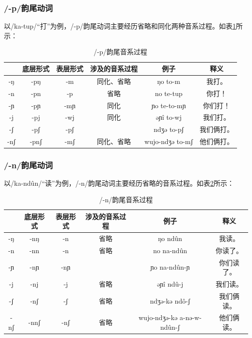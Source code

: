 \subsubsection{/-p/韵尾动词}

以/ka-tup/“打”为例，/-p/韵尾动词主要经历省略和同化两种音系过程。如表\ref{pcodapro}所示：

\begin{table}[H]
\vspace{5pt}
    \centering
    \caption{/-p/韵尾音系过程}
    \label{pcodapro}
\begin{tabular}{c|ccccc}
\toprule
    & 底层形式 & 表层形式 & 涉及的音系过程 & 例子                      & 释义     \\
\midrule
-ŋ  & -pŋ  & -m   & 同化、省略   & ŋo to-m         & 我打。   \\
-n  & -pn  & -p   & 省略      & no te-tup       & 你打！   \\
-ɲ  & -pɲ  & -mɲ  & 同化      & ɲo te-to-mɲ     & 你们打！  \\
-j  & -pj  & -wj  & 同化      & əɲî to-wj      & 我们打。  \\
-ʃ  & -pʃ  & -pʃ  &         & ndʒə to-pʃ      & 我们俩打。 \\
-nʃ & -pnʃ & -mʃ  & 同化、省略   & wujo-ndʒə to-mʃ & 他们俩打。\\
\bottomrule
\end{tabular}
\end{table}

\subsubsection{/-n/韵尾动词}

以/ka-ndûn/“读”为例，/-n/韵尾动词主要经历省略的音系过程。如表\ref{ncodapro}所示：

\begin{table}[H]
\vspace{5pt}
    \centering
    \caption{/-n/韵尾音系过程}
    \label{ncodapro}
\begin{tabular}{c|ccccc}
\toprule
    & 底层形式 & 表层形式 & 涉及的音系过程 & 例子                      & 释义     \\
\midrule
-ŋ  & -nŋ  & -n   & 省略      & ŋo ndûn                   & 我读。   \\
-n  & -nn  & -n   & 省略      & no na-ndûn                & 你读了。  \\
-ɲ  & -nɲ  & -nɲ  &         & ɲo na-ndûn-ɲ               & 你们读了。 \\
-j  & -nj  & -j   & 省略      & əɲî ndû-j                 & 我们读。  \\
-ʃ  & -nʃ  & -ʃ   & 省略      & ndʒə-kə ndô-ʃ              & 我们俩读。 \\
-nʃ & -nnʃ & -nʃ  & 省略      & wujo-ndʒə-kə a-nə-w-ndûn-ʃ & 他们俩读。\\
\bottomrule
\end{tabular}
\end{table}

